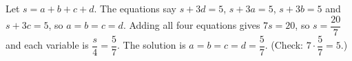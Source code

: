 Let $s=a+b+c+d$. The equations say $s+3d=5$, $s+3a=5$, $s+3b=5$ and $s+3c=5$, so $a=b=c=d$. Adding all four equations gives $7s=20$, so $s=\dfrac{20}{7}$ and each variable is $\dfrac{s}{4}=\dfrac{5}{7}$. The solution is $\boxed{a=b=c=d=\dfrac{5}{7}}$. (Check: $7\cdot\dfrac{5}{7}=5$.)
